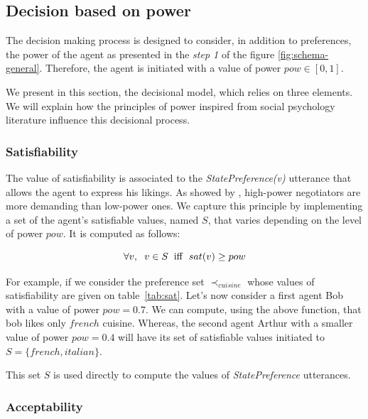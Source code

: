 \documentclass[conference, letterpaper]{IEEEtran}
\begin{document}
	
	\subsection{Decision based on power}
	\label{sec:dec}
	The decision making process is designed to consider, in addition to preferences, the power of the agent as presented in the \textit{step 1} of the figure \ref{fig:schema-general}. 
	Therefore, the agent is initiated with a value of power $pow \in [0,1]$. 
	
	We present in this section, the decisional model, which relies on three elements. We will explain how the principles of power inspired from social psychology literature influence this decisional process.

	
	\subsubsection{Satisfiability}
	\label{sec:sat}
	The value of satisfiability is associated to the \emph{StatePreference(v)} utterance that allows the agent to express his likings. As showed by \cite{de1995impact}, high-power negotiators are more demanding than low-power ones.
	We capture this principle by implementing a set of the agent's satisfiable values, named $S$, that varies depending on the level of power $pow$. It is computed as follows:

	\begin{equation}
		\forall v,\hspace{2mm} v\in S\hspace{2mm}\mathrm{iff}\hspace{2mm}sat(v) \geq pow
	\end{equation}
	
	For example, if we consider the preference set $\prec_{cuisine}$ whose values of satisfiability are given on table~\ref{tab:sat}. Let's now consider a first agent Bob with a value of power $pow = 0.7$. We can compute, using the above function, that bob likes only $french$ cuisine. Whereas, the second agent Arthur with a smaller value of power $pow=0.4$ will have its set of satisfiable values initiated to $S= \{french, italian\}$. 
	
    This set $S$ is used directly to compute the values of \emph{StatePreference} utterances.
	
	\subsubsection{Acceptability}
	
\end{document}
